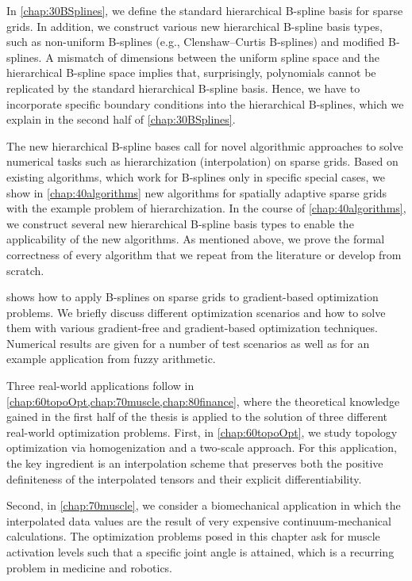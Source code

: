 In \cref{chap:30BSplines}, we define
the standard hierarchical B-spline basis for sparse grids.
In addition, we construct various new hierarchical
B-spline basis types, such as
non-uniform B-splines (e.g., Clenshaw--Curtis B-splines) and
modified B-splines.
A mismatch of dimensions between the uniform spline space and the
hierarchical B-spline space implies that, surprisingly,
polynomials cannot be replicated by the
standard hierarchical B-spline basis.
Hence, we have to incorporate specific boundary conditions
 into the hierarchical B-splines,
which we explain in the second half of \cref{chap:30BSplines}.

The new hierarchical B-spline bases call for novel algorithmic approaches
to solve numerical tasks such as
hierarchization (interpolation) on sparse grids.
Based on existing algorithms,
which work for B-splines only in specific special cases,
we show in \cref{chap:40algorithms} new algorithms for
spatially adaptive sparse grids with the example problem of hierarchization.
In the course of \cref{chap:40algorithms}, we construct several new
hierarchical B-spline basis types to enable the
applicability of the new algorithms.
As mentioned above, we prove the formal correctness of every algorithm
that we repeat from the literature or develop from scratch.

 shows how to apply B-splines on sparse grids
to gradient-based optimization problems.
We briefly discuss different optimization scenarios and how to solve them
with various gradient-free and gradient-based optimization techniques.
Numerical results are given for a number of test scenarios as well
as for an example application from fuzzy arithmetic.

Three real-world applications follow in
\cref{chap:60topoOpt,chap:70muscle,chap:80finance},
where the theoretical knowledge gained in the first half of the thesis
is applied to the solution of three different real-world optimization problems.
%
First, in \cref{chap:60topoOpt},
we study topology optimization via homogenization
and a two-scale approach.
For this application, the key ingredient is an interpolation scheme
that preserves both the positive definiteness of the interpolated tensors and
their explicit differentiability.

Second, in \cref{chap:70muscle},
we consider a biomechanical application in which the interpolated data values
are the result of very expensive continuum-mechanical calculations.
The optimization problems posed in this chapter ask for
muscle activation levels such that a specific joint angle is attained,
which is a recurring problem in medicine and robotics.

